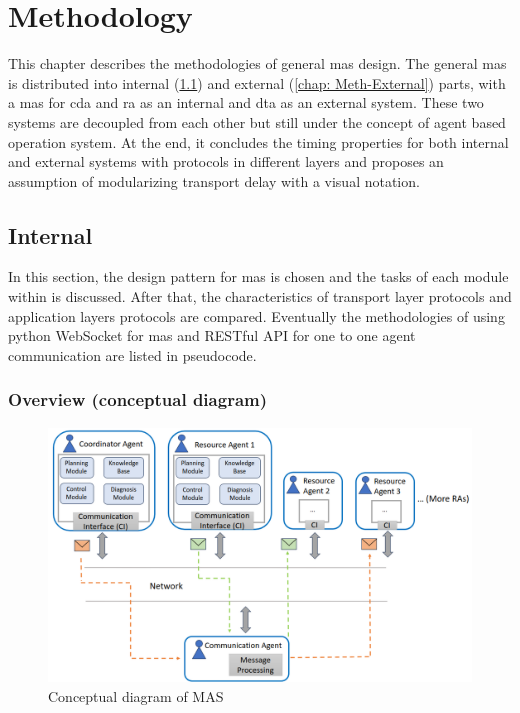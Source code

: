 \chapter{Methodology}\label{chap: Meth}%
This chapter describes the methodologies of general \gls{mas} design. 
The general \gls{mas} is distributed into internal (\ref{chap: Meth-Internal}) and external (\ref{chap: Meth-External}) parts,  
with a \gls{mas} for \gls{cda} and \gls{ra} as an internal and \gls{dta} as an external system. 
These two systems are decoupled from each other but still under the concept of agent based operation system. 
At the end, it concludes the timing properties for both 
internal and external systems with protocols in 
different layers and proposes an assumption of modularizing transport 
delay with a visual notation.
\section{Internal}\label{chap: Meth-Internal}
In this section, the design pattern for \gls{mas} is chosen and the tasks of each module within is discussed.
After that, the characteristics of transport layer protocols and application layers protocols are compared. 
Eventually the methodologies of using python WebSocket for \gls{mas} and RESTful API for one to one agent communication are listed in pseudocode. 

\subsection{Overview (conceptual diagram)}

\begin{figure}[htb]
\includegraphics[width=\textwidth]{figures/MAS_Conceptual_Diagram.png}
\centering
\caption{Conceptual diagram of MAS\label{fig: MASConceptual}}
\end{figure}

